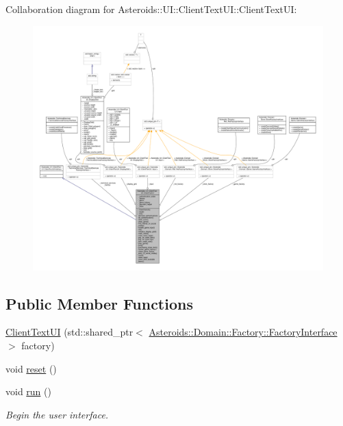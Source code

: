 Collaboration diagram for Asteroids\+:\+:UI\+:\+:Client\+Text\+UI\+:\+:Client\+Text\+UI\+:
\nopagebreak
\begin{figure}[H]
\begin{center}
\leavevmode
\includegraphics[width=350pt]{classAsteroids_1_1UI_1_1ClientTextUI_1_1ClientTextUI__coll__graph}
\end{center}
\end{figure}
\subsection*{Public Member Functions}
\begin{DoxyCompactItemize}
\item 
\hyperlink{classAsteroids_1_1UI_1_1ClientTextUI_1_1ClientTextUI_aec13a3cf71cb24f12d9c9b44066e1243}{Client\+Text\+UI} (std\+::shared\+\_\+ptr$<$ \hyperlink{classAsteroids_1_1Domain_1_1Factory_1_1FactoryInterface}{Asteroids\+::\+Domain\+::\+Factory\+::\+Factory\+Interface} $>$ factory)
\item 
void \hyperlink{classAsteroids_1_1UI_1_1ClientTextUI_1_1ClientTextUI_a6efe3f748a4eee4913824be2aab9ab18}{reset} ()
\item 
void \hyperlink{classAsteroids_1_1UI_1_1ClientTextUI_1_1ClientTextUI_a835f455a627e77a5ef99661350281ec3}{run} ()
\begin{DoxyCompactList}\small\item\em Begin the user interface. \end{DoxyCompactList}\end{DoxyCompactItemize}
